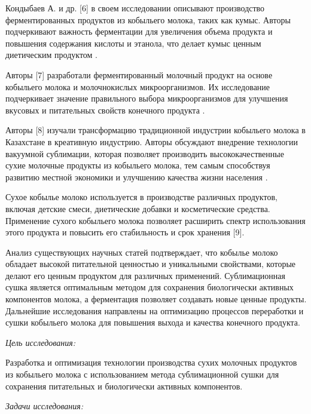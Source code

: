 Кондыбаев А. и др. {[}6{]} в своем исследовании описывают производство
ферментированных продуктов из кобыльего молока, таких как кумыс. Авторы
подчеркивают важность ферментации для увеличения объема продукта и
повышения содержания кислоты и этанола, что делает кумыс ценным
диетическим продуктом .

Авторы {[}7{]} разработали ферментированный молочный продукт на основе
кобыльего молока и молочнокислых микроорганизмов. Их исследование
подчеркивает значение правильного выбора микроорганизмов для улучшения
вкусовых и питательных свойств конечного продукта .

Авторы {[}8{]} изучали трансформацию традиционной индустрии кобыльего
молока в Казахстане в креативную индустрию. Авторы обсуждают внедрение
технологии вакуумной сублимации, которая позволяет производить
высококачественные сухие молочные продукты из кобыльего молока, тем
самым способствуя развитию местной экономики и улучшению качества жизни
населения .

Сухое кобылье молоко используется в производстве различных продуктов,
включая детские смеси, диетические добавки и косметические средства.
Применение сухого кобыльего молока позволяет расширить спектр
использования этого продукта и повысить его стабильность и срок хранения
{[}9{]}.

Анализ существующих научных статей подтверждает, что кобылье молоко
обладает высокой питательной ценностью и уникальными свойствами, которые
делают его ценным продуктом для различных применений. Сублимационная
сушка является оптимальным методом для сохранения биологически активных
компонентов молока, а ферментация позволяет создавать новые ценные
продукты. Дальнейшие исследования направлены на оптимизацию процессов
переработки и сушки кобыльего молока для повышения выхода и качества
конечного продукта.

\emph{Цель исследования:}

Разработка и оптимизация технологии производства сухих молочных
продуктов из кобыльего молока с использованием метода сублимационной
сушки для сохранения питательных и биологически активных компонентов.

\emph{Задачи исследования:}

